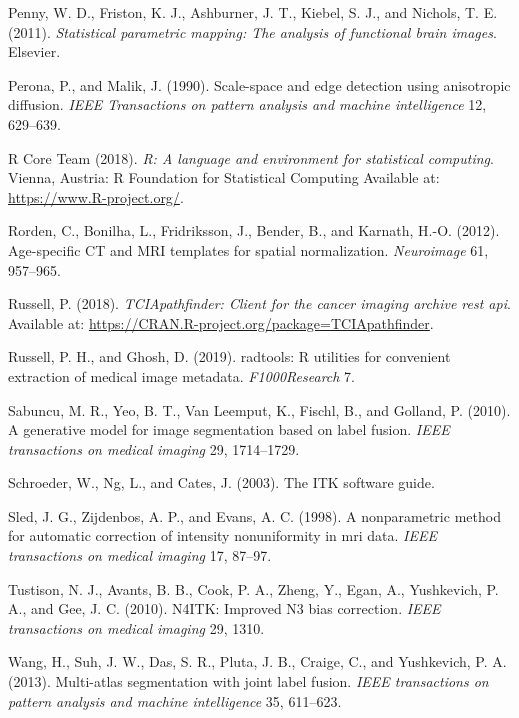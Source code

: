 \documentclass[utf8]{frontiersSCNS}
\begin{document}
\leavevmode\hypertarget{ref-spm}{}%
Penny, W. D., Friston, K. J., Ashburner, J. T., Kiebel, S. J., and Nichols, T. E. (2011). \emph{Statistical parametric mapping: The analysis of functional brain images}. Elsevier.

\leavevmode\hypertarget{ref-peronamalik}{}%
Perona, P., and Malik, J. (1990). Scale-space and edge detection using anisotropic diffusion. \emph{IEEE Transactions on pattern analysis and machine intelligence} 12, 629--639.

\leavevmode\hypertarget{ref-R}{}%
R Core Team (2018). \emph{R: A language and environment for statistical computing}. Vienna, Austria: R Foundation for Statistical Computing Available at: \url{https://www.R-project.org/}.

\leavevmode\hypertarget{ref-rorden2012age}{}%
Rorden, C., Bonilha, L., Fridriksson, J., Bender, B., and Karnath, H.-O. (2012). Age-specific CT and MRI templates for spatial normalization. \emph{Neuroimage} 61, 957--965.

\leavevmode\hypertarget{ref-TCIApathfinder}{}%
Russell, P. (2018). \emph{TCIApathfinder: Client for the cancer imaging archive rest api}. Available at: \url{https://CRAN.R-project.org/package=TCIApathfinder}.

\leavevmode\hypertarget{ref-radtools}{}%
Russell, P. H., and Ghosh, D. (2019). radtools: R utilities for convenient extraction of medical image metadata. \emph{F1000Research} 7.

\leavevmode\hypertarget{ref-sabuncu2010generative}{}%
Sabuncu, M. R., Yeo, B. T., Van Leemput, K., Fischl, B., and Golland, P. (2010). A generative model for image segmentation based on label fusion. \emph{IEEE transactions on medical imaging} 29, 1714--1729.

\leavevmode\hypertarget{ref-itk}{}%
Schroeder, W., Ng, L., and Cates, J. (2003). The ITK software guide.

\leavevmode\hypertarget{ref-sled1998nonparametric}{}%
Sled, J. G., Zijdenbos, A. P., and Evans, A. C. (1998). A nonparametric method for automatic correction of intensity nonuniformity in mri data. \emph{IEEE transactions on medical imaging} 17, 87--97.

\leavevmode\hypertarget{ref-n4}{}%
Tustison, N. J., Avants, B. B., Cook, P. A., Zheng, Y., Egan, A., Yushkevich, P. A., and Gee, J. C. (2010). N4ITK: Improved N3 bias correction. \emph{IEEE transactions on medical imaging} 29, 1310.

\leavevmode\hypertarget{ref-malf}{}%
Wang, H., Suh, J. W., Das, S. R., Pluta, J. B., Craige, C., and Yushkevich, P. A. (2013). Multi-atlas segmentation with joint label fusion. \emph{IEEE transactions on pattern analysis and machine intelligence} 35, 611--623.
\end{document}
